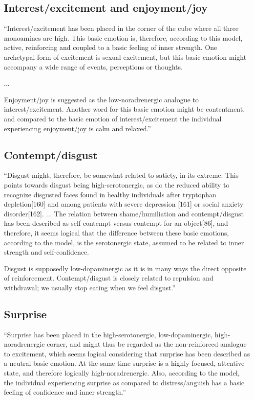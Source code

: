 \subsection{Interest/excitement and enjoyment/joy}

``Interest/excitement has been placed in the corner of the cube where all three monoamines are high. This basic emotion is, therefore, according to this model, active, reinforcing and coupled to a basic feeling of inner strength. One archetypal form of excitement is sexual excitement, but this basic emotion might accompany a wide range of events, perceptions or thoughts.

...

Enjoyment/joy is suggested as the low-noradrenergic analogue to interest/excitement. Another word for this basic emotion might
be contentment, and compared to the basic emotion of interest/excitement the individual experiencing enjoyment/joy is calm and relaxed.''

\subsection{Contempt/disgust}

``Disgust might, therefore, be somewhat related to satiety, in its extreme. This points towards disgust being high-serotonergic, as do the reduced ability to recognize disgusted faces found in healthy individuals after tryptophan depletion[160] and among patients with severe depression [161] or social anxiety disorder[162]. ... The relation between shame/humiliation and contempt/disgust has been described as self-contempt versus contempt for an object[86], and therefore, it seems logical that the difference between these basic emotions, according to the model, is the serotonergic state, assumed to be related to inner strength and self-confidence.

Disgust is supposedly low-dopaminergic as it is in many ways the direct opposite of reinforcement. Contempt/disgust is closely
related to repulsion and withdrawal; we usually stop eating when we feel disgust.''

\subsection{Surprise}

``Surprise has been placed in the high-serotonergic, low-dopaminergic, high-noradrenergic corner, and might thus be regarded as the non-reinforced analogue to excitement, which seems logical considering that surprise has been described as a neutral basic emotion. At the same time surprise is a highly focused, attentive state, and therefore logically high-noradrenergic. Also, according to the model, the individual experiencing surprise as compared to distress/anguish has a basic feeling of confidence and inner strength.''

